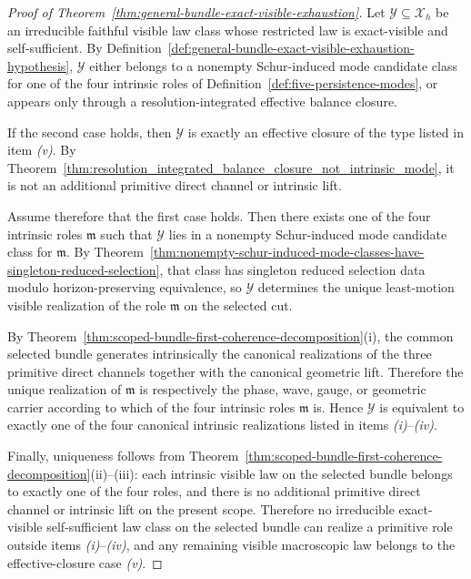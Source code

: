 \begin{proof}[Proof of Theorem~\ref{thm:general-bundle-exact-visible-exhaustion}]
\label{proof:thm:general-bundle-exact-visible-exhaustion}
Let \(\mathcal Y\subseteq \mathcal X_h\) be an irreducible faithful visible law
class whose restricted law is exact-visible and self-sufficient. By
Definition~\ref{def:general-bundle-exact-visible-exhaustion-hypothesis},
\(\mathcal Y\) either belongs to a nonempty Schur-induced mode candidate class
for one of the four intrinsic roles of
Definition~\ref{def:five-persistence-modes}, or appears only through a
resolution-integrated effective balance closure.

If the second case holds, then \(\mathcal Y\) is exactly an effective closure
of the type listed in item \emph{(v)}. By
Theorem~\ref{thm:resolution_integrated_balance_closure_not_intrinsic_mode}, it
is not an additional primitive direct channel or intrinsic lift.

Assume therefore that the first case holds. Then there exists one of the four
intrinsic roles \(\mathfrak m\) such that \(\mathcal Y\) lies in a nonempty
Schur-induced mode candidate class for \(\mathfrak m\). By
Theorem~\ref{thm:nonempty-schur-induced-mode-classes-have-singleton-reduced-selection},
that class has singleton reduced selection data modulo horizon-preserving
equivalence, so \(\mathcal Y\) determines the unique least-motion visible
realization of the role \(\mathfrak m\) on the selected cut.

By
Theorem~\ref{thm:scoped-bundle-first-coherence-decomposition}(i), the common
selected bundle generates intrinsically the canonical realizations of the
three primitive direct channels together with the canonical geometric lift.
Therefore the unique realization of \(\mathfrak m\) is respectively the phase,
wave, gauge, or geometric carrier according to which of the four intrinsic
roles \(\mathfrak m\) is. Hence \(\mathcal Y\) is equivalent to exactly one of
the four canonical intrinsic realizations listed in items
\emph{(i)}--\emph{(iv)}.

Finally, uniqueness follows from
Theorem~\ref{thm:scoped-bundle-first-coherence-decomposition}(ii)--(iii): each
intrinsic visible law on the selected bundle belongs to exactly one of the four
roles, and there is no additional primitive direct channel or intrinsic lift on
the present scope. Therefore no irreducible exact-visible self-sufficient law
class on the selected bundle can realize a primitive role outside items
\emph{(i)}--\emph{(iv)}, and any remaining visible macroscopic law belongs to
the effective-closure case \emph{(v)}.
\end{proof}

